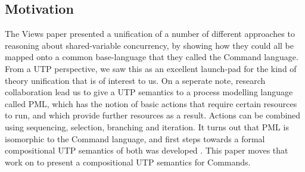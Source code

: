 \subsection{Motivation}\label{ssec:motivate}

The Views paper\cite{conf/popl/Dinsdale-YoungBGPY13}
presented a unification of a number of different approaches to reasoning
about shared-variable concurrency,
by showing how they could all be mapped onto a common base-language
that they called the Command language.
From a UTP perspective,
we saw this as an excellent launch-pad for the kind of theory unification
that is of interest to us.
On a seperate note,
research collaboration lead us to give a UTP semantics to a process modelling
language called PML\cite{DBLP:journals/infsof/AtkinsonWN07},
which has the notion of basic actions that require certain resources to run,
and which provide further resources as a result.
Actions can be combined
using sequencing, selection, branching and iteration.
It turns out that PML is isomorphic to the Command language,
and first steps towards
a formal compositional UTP semantics of both was developed
\cite{conf/tase/BMN16}.
This paper moves that work on to present
a compositional UTP semantics for Commands.
